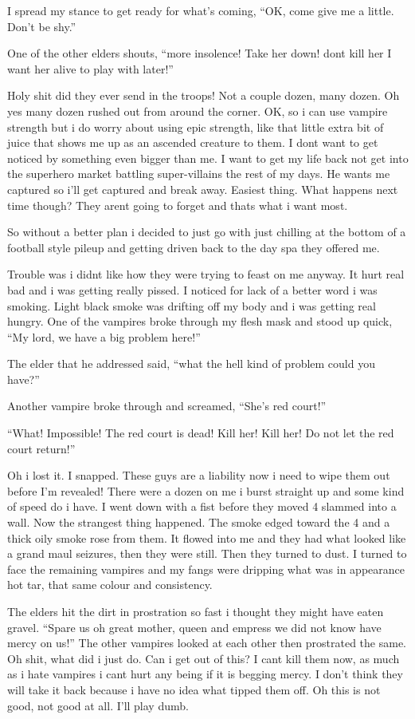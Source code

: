 I spread my stance to get ready for what's coming, ``OK, come give me a little. Don't be shy.''

One of the other elders shouts, ``more insolence! Take her down! dont kill her I want her alive to play with later!''

Holy shit did they ever send in the troops! Not a couple dozen, many dozen. Oh yes many dozen rushed out from around the corner. OK, so i can use vampire strength but i do worry about using epic strength, like that little extra bit of juice that shows me up as an ascended creature to them. I dont want to get noticed by something even bigger than me. I want to get my life back not get into the superhero market battling super-villains the rest of my days. He wants me captured so i'll get captured and break away. Easiest thing. What happens next time though? They arent going to forget and thats what i want most.

So without a better plan i decided to just go with just chilling at the bottom of a football style pileup and getting driven back to the day spa they offered me.

Trouble was i didnt like how they were trying to feast on me anyway. It hurt real bad and i was getting really pissed. I noticed for lack of a better word i was smoking. Light black smoke was drifting off my body and i was getting real hungry. One of the vampires broke through my flesh mask and stood up quick, ``My lord, we have a big problem here!'' 

The elder that he addressed said, ``what the hell kind of problem could you have?'' 

Another vampire broke through and screamed, ``She's red court!''

``What! Impossible! The red court is dead! Kill her! Kill her! Do not let the red court return!''

Oh i lost it. I snapped. These guys are a liability now i need to wipe them out before I'm revealed! There were a dozen on me i burst straight up and some kind of speed do i have. I went down with a fist before they moved 4 slammed into a wall. Now the strangest thing happened. The smoke edged toward the 4 and a thick oily smoke rose from them. It flowed into me and they had what looked like a grand maul seizures, then they were still. Then they turned to dust. I turned to face the remaining vampires and my fangs were dripping what was in appearance hot tar, that same colour and consistency.

The elders hit the dirt in prostration so fast i thought they might have eaten gravel. ``Spare us oh great mother, queen and empress we did not know have mercy on us!'' The other vampires looked at each other then prostrated the same. Oh shit, what did i just do. Can i get out of this? I cant kill them now, as much as i hate vampires i cant hurt any being if it is begging mercy. I don't think they will take it back because i have no idea what tipped them off. Oh this is not good, not good at all. I'll play dumb.

